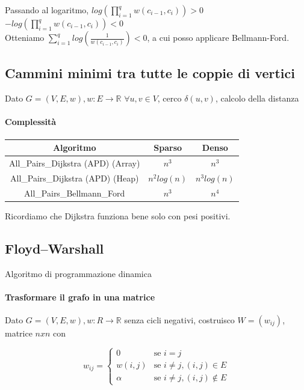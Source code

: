 \documentclass[11pt,a4paper,twoside,openright]{book}
\let\oldparagraph\paragraph
\renewcommand{\paragraph}[1]{\oldparagraph{#1}\mbox{}}
\begin{document}
{{Passando al logaritmo, $log(\prod_{i=1}^q{w(c_{i-1},c_i)}) > 0$ \\
$-log(\prod_{i=1}^q{w(c_{i-1},c_i)}) < 0$ \\
Otteniamo $\sum_{i=1}^q{log(\frac{1}{w(c_{i-1},c_i)})} < 0$, a cui posso applicare Bellmann-Ford.

\subsection{Cammini minimi tra tutte le coppie di vertici}

Dato $G=(V,E,w), w: E \rightarrow \mathbb{R}$
$\forall u,v \in V$, cerco $\delta(u,v)$, calcolo della distanza




\paragraph{Complessità}

\begin{tabular}{|c|c|c|}
\hline 
Algoritmo & Sparso & Denso \\ 
\hline 
All\_Pairs\_Dijkstra (APD) (Array) & $n^3$ & $n^3$ \\ 
\hline 
All\_Pairs\_Dijkstra (APD) (Heap) & $n^2log(n)$ & $n^3log(n)$ \\ 
\hline 
All\_Pairs\_Bellmann\_Ford & $n^3$ & $n^4$ \\ 
\hline 
\end{tabular} 

Ricordiamo che Dijkstra funziona bene solo con pesi positivi.

\subsection{Floyd–Warshall}

Algoritmo di programmazione dinamica

\paragraph{Trasformare il grafo in una matrice}

Dato $G=(V,E,w), w : R \rightarrow \mathbb{R}$ senza cicli negativi, costruisco $W=(w_{ij})$, matrice $nxn$ con

\begin{equation}
w_{ij} = 
\begin{cases}
0 & \mbox{se } i=j \\ 
w(i,j) & \mbox{se } i\neq j, (i,j) \in E \\ 
\alpha & \mbox{se } i\neq j, (i,j) \notin E
\end{cases}
\end{equation}

}}
\end{document}
